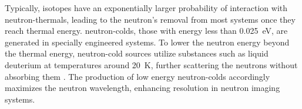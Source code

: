 \documentclass[../../../../main.tex]{subfiles}%
\begin{document}
    Typically, isotopes have an exponentially larger probability of interaction with \glspl{neutron-thermal}, leading to the neutron's removal from most systems once they reach thermal energy.
    \Glspl{neutron-cold}, those with energy less than \SI{0.025}{\electronvolt}, are generated in specially engineered systems.
    To lower the neutron energy beyond the thermal energy, \gls{neutron-cold} sources utilize substances such as liquid deuterium at temperatures around \SI{20}{\kelvin}, further scattering the neutrons without absorbing them \cite{Farrell_2001, Quach_2007, Anghel_2009}.
    The production of low energy \glspl{neutron-cold} accordingly maximizes the neutron wavelength, enhancing resolution in neutron imaging systems.
\end{document}
